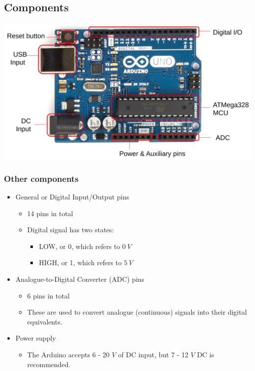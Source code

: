 \documentclass[11pt]{article}
\begin{document}
\subsection{Components}
\label{sec:org3a370a3}
\begin{center}
\includegraphics[width=.9\linewidth]{./images/arduino-uno-components.png}
\end{center}

\subsubsection{Other components}
\label{sec:org84ef586}
\begin{itemize}
\item General or Digital Input/Output pins
\begin{itemize}
\item 14 pins in total
\item Digital signal has two states:
\begin{itemize}
\item LOW, or 0, which refers to \(\qty{0}{V}\)
\item HIGH, or 1, which refers to \(\qty{5}{V}\)
\end{itemize}
\end{itemize}
\item Analogue-to-Digital Converter (ADC) pins
\begin{itemize}
\item 6 pins in total
\item These are used to convert analogue (continuous) signals into their digital equivalents.
\end{itemize}
\item Power supply
\begin{itemize}
\item The Arduino accepts 6 - 20 \(\unit{V}\) of DC input, but 7 - 12 \(\unit{V}\) DC is recommended.
\end{itemize}
\end{itemize}
\end{document}
